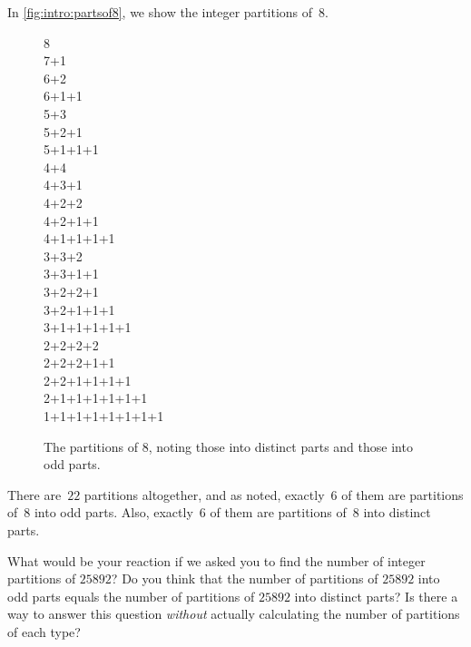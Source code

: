 \begin{example}
In \autoref{fig:intro:partsof8}, we show the integer partitions
of~$8$.
\begin{figure}[hb]
\begin{multicols}{3}
  8\quad{}\\
  7+1\quad{}\\
  6+2\quad{}\\
  6+1+1\\
  5+3\quad{}\\
  5+2+1\quad{}\\
  5+1+1+1\quad{}\\
  4+4\\
  4+3+1\quad{}\\
  4+2+2\\
  4+2+1+1\\
  4+1+1+1+1\\
  3+3+2\\
  3+3+1+1\quad{}\\
  3+2+2+1\\
  3+2+1+1+1\\
  3+1+1+1+1+1\quad{}\\
  2+2+2+2\\
  2+2+2+1+1\\
  2+2+1+1+1+1\\
  2+1+1+1+1+1+1\\
  1+1+1+1+1+1+1+1\quad{}  
\end{multicols}
\caption{The partitions of $8$, noting those into distinct parts
  and those into odd parts.}
\label{fig:intro:partsof8}
\end{figure}
There are~$22$ partitions altogether, and as noted, exactly~$6$
of them are partitions of~$8$ into odd parts.  Also, exactly~$6$ of them
are partitions of~$8$ into distinct parts.

What would be your reaction if we asked you to find the number of
integer partitions of $25892$?  Do you think that the number of
partitions of $25892$ into odd parts equals the number of partitions
of $25892$ into distinct parts?  Is there a way to answer this
question \textit{without} actually calculating the number of
partitions of each type?
\end{example}

